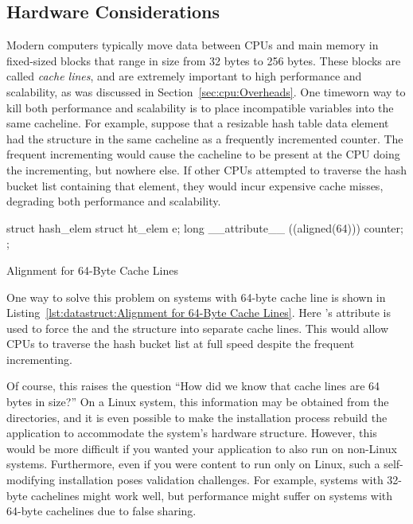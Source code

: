 \subsection{Hardware Considerations}
\label{sec:datastruct:Hardware Considerations}

Modern computers typically move data between CPUs and main memory in
fixed-sized blocks that range in size from 32 bytes to 256 bytes.
These blocks are called \emph{cache lines}, and are extremely important
to high performance and scalability, as was discussed in
Section~\ref{sec:cpu:Overheads}.
One timeworn way to kill both performance and scalability is to
place incompatible variables into the same cacheline.
For example, suppose that a resizable hash table data element had
the  structure in the same cacheline as a frequently incremented
counter.
The frequent incrementing would cause the cacheline to be present at
the CPU doing the incrementing, but nowhere else.
If other CPUs attempted to traverse the hash bucket list containing
that element, they would incur expensive cache misses, degrading both
performance and scalability.

\begin{listing}[tb]
\begin{VerbatimL}
struct hash_elem {
	struct ht_elem e;
	long __attribute__ ((aligned(64))) counter;
};
\end{VerbatimL}
\caption{Alignment for 64-Byte Cache Lines}
\label{lst:datastruct:Alignment for 64-Byte Cache Lines}
\end{listing}

One way to solve this problem on systems with 64-byte cache line is shown in
Listing~\ref{lst:datastruct:Alignment for 64-Byte Cache Lines}.
Here \GCC's  attribute is used to force the 
and the  structure into separate cache lines.
This would allow CPUs to traverse the hash bucket list at full speed
despite the frequent incrementing.

Of course, this raises the question ``How did we know that cache lines
are 64 bytes in size?''
On a Linux system, this information may be obtained from the
 directories, and it is even
possible to make the installation process rebuild the application to
accommodate the system's hardware structure.
However, this would be more difficult if you wanted your application to
also run on non-Linux systems.
Furthermore, even if you were content to run only on Linux, such a
self-modifying installation poses validation challenges.
For example, systems with 32-byte cachelines might work well, but
performance might suffer on systems with 64-byte cachelines due
to false sharing.

